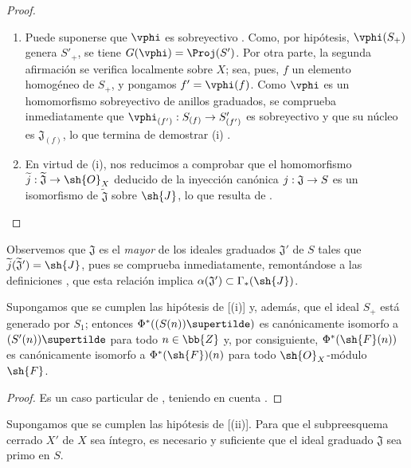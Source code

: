 \documentclass[oneside,10pt]{amsart}
\makeatletter
\newcommand{\ega@arrow}[2]{\mathchoice{#1}{#2}{#2}{#2}}
\renewcommand{\to}{\ega@arrow{\longrightarrow}{\rightarrow}}
\let\EGAOriginalLabel\label
\renewcommand{\label}[1]{\phantomsection\EGAOriginalLabel{#1}}
\makeatother
\begin{document}
\begin{proof}
\medskip\noindent
\begin{enumerate}
  \item[{\rm(i)}] Puede suponerse que $\vphi$ es sobreyectivo .
    Como, por hipótesis, $\vphi(S_+)$ genera $S'_+$, se tiene $G(\vphi)=\Proj(S')$.
    Por otra parte, la segunda afirmación se verifica localmente sobre $X$; sea, pues, $f$ un elemento homogéneo de $S_+$, y pongamos $f'=\vphi(f)$.
    Como $\vphi$ es un homomorfismo sobreyectivo de anillos graduados, se comprueba inmediatamente que $\vphi_{(f')}:S_{(f)}\to S'_{(f')}$ es sobreyectivo y que su núcleo es $\mathfrak{J}_{(f)}$, lo que termina de demostrar (i) .
  \item[{\rm(ii)}] En virtud de (i), nos reducimos a comprobar que el homomorfismo $\widetilde{j}:\widetilde{\mathfrak{J}}\to\sh{O}_X$ deducido de la inyección canónica $j:\mathfrak{J}\to S$ es un isomorfismo de $\widetilde{\mathfrak{J}}$ sobre $\sh{J}$, lo que resulta de .
\end{enumerate}
\end{proof}

Observemos que $\mathfrak{J}$ es el \emph{mayor} de los ideales graduados $\mathfrak{J}'$ de $S$ tales que $\widetilde{j}(\widetilde{\mathfrak{J}}')=\sh{J}$, pues se comprueba inmediatamente, remontándose a las definiciones , que esta relación implica $\alpha(\mathfrak{J}')\subset\Gamma_*(\sh{J})$.

\begin{corollary}[2.9.3]
\label{II.2.9.3}
Supongamos que se cumplen las hipótesis de [(i)] y, además, que el ideal $S_+$ está generado por $S_1$; entonces $\Phi^*((S(n))\supertilde)$ es canónicamente isomorfo a $(S'(n))\supertilde$ para todo $n\in\bb{Z}$ y, por consiguiente, $\Phi^*(\sh{F}(n))$ es canónicamente isomorfo a $\Phi^*(\sh{F})(n)$ para todo $\sh{O}_X$-módulo $\sh{F}$.
\end{corollary}

\begin{proof}
Es un caso particular de , teniendo en cuenta .
\end{proof}

\begin{corollary}[2.9.4]
\label{II.2.9.4}
Supongamos que se cumplen las hipótesis de [(ii)].
Para que el subpreesquema cerrado $X'$ de $X$ sea íntegro, es necesario y suficiente que el ideal graduado $\mathfrak{J}$ sea primo en $S$.
\end{corollary}
\end{document}
